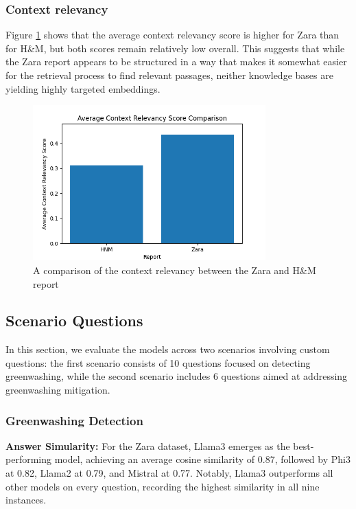 \documentclass[]{article}
\begin{document}
\subsubsection{Context relevancy}
Figure \ref{fig:image_label} shows that the average context relevancy score is higher for Zara than for H\&M, but both scores remain relatively low overall. This suggests that while the Zara report appears to be structured in a way that makes it somewhat easier for the retrieval process to find relevant passages, neither knowledge bases are yielding highly targeted embeddings.
\begin{figure}[H]
    \centering
    \includegraphics[width=0.8\textwidth]{./images/context_relevancy_comp.png}
    \caption{A comparison of the context relevancy between the Zara and H\&M report}
    \label{fig:image_label}
\end{figure}
\subsection{Scenario Questions}
In this section, we evaluate the models across two scenarios involving custom questions: 
the first scenario consists of 10 questions focused on detecting greenwashing, 
while the second scenario includes 6 questions aimed at addressing greenwashing mitigation.

\subsubsection{Greenwashing Detection}
\textbf{Answer Simularity:} 
For the Zara dataset, Llama3 emerges as the best-performing model, achieving an average cosine similarity of 0.87, followed by Phi3 at 0.82, Llama2 at 0.79, and Mistral at 0.77. Notably, Llama3 outperforms all other models on every question, recording the highest similarity in all nine instances.
\end{document}
